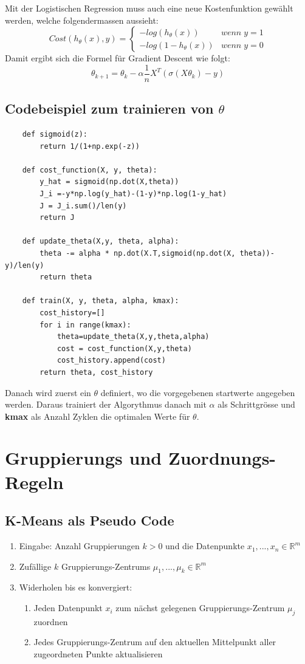 \documentclass{article}
\begin{document}
	Mit der Logistischen Regression muss auch eine neue Kostenfunktion gewählt werden, welche folgendermassen aussieht:
	$$Cost(h_\theta(x), y) = \begin{cases}
	-log(h_\theta(x)) & wenn\;y = 1 \\
	-log(1-h_\theta(x)) & wenn\;y = 0
	\end{cases}$$
	Damit ergibt sich die Formel für Gradient Descent wie folgt:
	$$\theta_{k+1}=\theta_k-\alpha\frac{1}{n}X^T(\sigma(X\theta_k)-y)$$
	\newpage
	\subsection{Codebeispiel zum trainieren von $\theta$}
	\begin{lstlisting}
	def sigmoid(z):
		return 1/(1+np.exp(-z))
	
	def cost_function(X, y, theta):
		y_hat = sigmoid(np.dot(X,theta))
		J_i =-y*np.log(y_hat)-(1-y)*np.log(1-y_hat)
		J = J_i.sum()/len(y)
		return J
	
	def update_theta(X,y, theta, alpha):
		theta -= alpha * np.dot(X.T,sigmoid(np.dot(X, theta))-y)/len(y)
		return theta
	
	def train(X, y, theta, alpha, kmax):
		cost_history=[]
		for i in range(kmax):
			theta=update_theta(X,y,theta,alpha)
			cost = cost_function(X,y,theta)
			cost_history.append(cost)
		return theta, cost_history
	\end{lstlisting}
	Danach wird zuerst ein $\theta$ definiert, wo die vorgegebenen startwerte angegeben werden. Daraus trainiert der Algorythmus danach mit $\alpha$ als Schrittgrösse und \textbf{kmax} als Anzahl Zyklen die optimalen Werte für $\theta$.
	
	\section{Gruppierungs und Zuordnungs-Regeln}
	\subsection{K-Means als Pseudo Code}
	\begin{enumerate}
		\item Eingabe: Anzahl Gruppierungen $k>0$ und die Datenpunkte $x_1,...,x_n \in \mathbb{R}^m$
		\item Zufällige $k$ Gruppierungs-Zentrums $\mu_1,...,\mu_k \in \mathbb{R}^m$
		\item Widerholen bis es konvergiert:
		\begin{enumerate}
			\item Jeden Datenpunkt $x_i$ zum nächst gelegenen Gruppierungs-Zentrum $\mu_j$ zuordnen
			\item Jedes Gruppierungs-Zentrum auf den aktuellen Mittelpunkt aller zugeordneten Punkte aktualisieren
		\end{enumerate}
	\end{enumerate}
\end{document}
